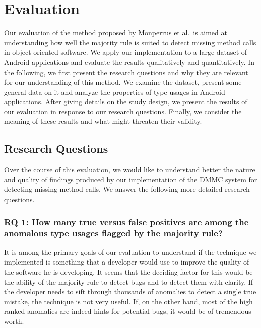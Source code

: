 \chapter{Evaluation}\label{ch:eval}

Our evaluation of the method proposed by Monperrus et al.\ is aimed at understanding how well the majority rule is suited to detect missing method calls in object oriented software.
We apply our implementation to a large dataset of Android applications and evaluate the results qualitatively and quantitatively.
In the following, we first present the research questions and why they are relevant for our understanding of this method.
We examine the dataset, present some general data on it and analyze the properties of type usages in Android applications.
After giving details on the study design, we present the results of our evaluation in response to our research questions.
Finally, we consider the meaning of these results and what might threaten their validity.

\section{Research Questions}\label{sc:rq}

Over the course of this evaluation, we would like to understand better the nature and quality of findings produced by our implementation of the $\text{DMMC}$ system for detecting missing method calls.
We answer the following more detailed research questions.

\subsection*{RQ 1: How many true versus false positives are among the anomalous type usages flagged by the majority rule?}

It is among the primary goals of our evaluation to understand if the technique we implemented is something that a developer would use to improve the quality of the software he is developing.
It seems that the deciding factor for this would be the ability of the majority rule to detect bugs and to detect them with clarity.
If the developer needs to sift through thousands of anomalies to detect a single true mistake, the technique is not very useful.
If, on the other hand, most of the high ranked anomalies are indeed hints for potential bugs, it would be of tremendous worth.

